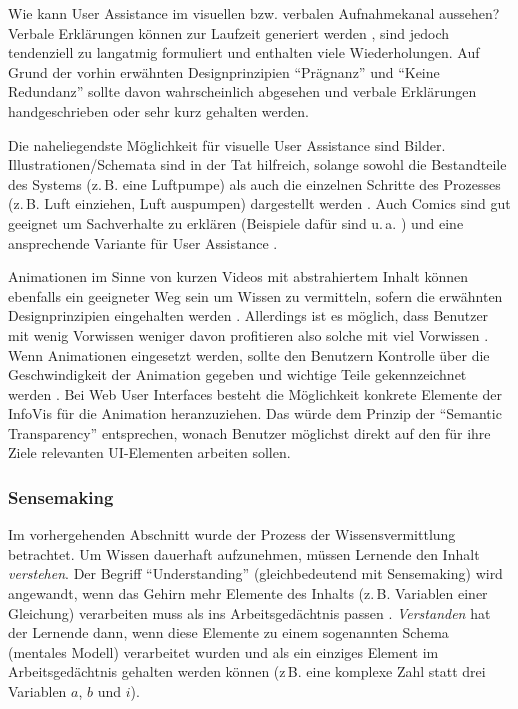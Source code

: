 \documentclass[
	headsepline,
	footsepline,
	fontsize=12pt,
	bibliography=totoc
]{scrbook}
\begin{document}

Wie kann User Assistance im visuellen bzw. verbalen Aufnahmekanal aussehen? Verbale Erklärungen können zur Laufzeit generiert werden \cite{Bauer2011, Gesell2012, Matheson2012}, sind jedoch tendenziell zu langatmig formuliert und enthalten viele Wiederholungen. Auf Grund der vorhin erwähnten Designprinzipien \enquote{Prägnanz} und \enquote{Keine Redundanz} sollte davon wahrscheinlich abgesehen und verbale Erklärungen handgeschrieben oder sehr kurz gehalten werden.

Die naheliegendste Möglichkeit für visuelle User Assistance sind Bilder. Illustrationen/Schemata sind in der Tat hilfreich, solange sowohl die Bestandteile des Systems (z.\,B. eine Luftpumpe) als auch die einzelnen Schritte des Prozesses (z.\,B. Luft einziehen, Luft auspumpen) dargestellt werden \cite{Mayer1990}. Auch Comics sind gut geeignet um Sachverhalte zu erklären (Beispiele dafür sind u.\,a. \cite{McCloud1994, McCloud2008}) und eine ansprechende Variante für User Assistance \cite{Webb2012}.

Animationen im Sinne von kurzen Videos mit abstrahiertem Inhalt können ebenfalls ein geeigneter Weg sein um Wissen zu vermitteln, sofern die erwähnten Designprinzipien eingehalten werden \cite{Mayer2002a}. Allerdings ist es möglich, dass Benutzer mit wenig Vorwissen weniger davon profitieren also solche mit viel Vorwissen \cite{Kalyuga2008}. Wenn Animationen eingesetzt werden, sollte den Benutzern Kontrolle über die Geschwindigkeit der Animation gegeben und wichtige Teile gekennzeichnet werden \cite{Wong2011}. Bei Web User Interfaces besteht die Möglichkeit konkrete Elemente der InfoVis für die Animation heranzuziehen. Das würde dem Prinzip der \enquote{Semantic Transparency} \cite{Kohlhase2009} entsprechen, wonach Benutzer möglichst direkt auf den für ihre Ziele relevanten UI-Elementen arbeiten sollen.

\subsubsection{Sensemaking}
\label{section:standderforschung:grundlagen:user_assistance:sensemaking}

Im vorhergehenden Abschnitt wurde der Prozess der Wissensvermittlung betrachtet. Um Wissen dauerhaft aufzunehmen, müssen Lernende den Inhalt \emph{verstehen}. Der Begriff \enquote{Understanding} (gleichbedeutend mit Sensemaking) wird angewandt, wenn das Gehirn mehr Elemente des Inhalts (z.\,B. Variablen einer Gleichung) verarbeiten muss als ins Arbeitsgedächtnis passen \cite{Sweller1998}. \emph{Verstanden} hat der Lernende dann, wenn diese Elemente zu einem sogenannten Schema (mentales Modell) verarbeitet wurden und als ein einziges Element im Arbeitsgedächtnis gehalten werden können (z\,B. eine komplexe Zahl statt drei Variablen $a$, $b$ und $i$).
\end{document}
